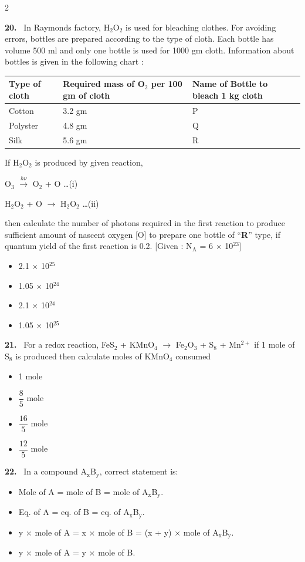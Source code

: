 \documentclass[10pt]{extarticle}
\newcommand{\qn}[1]{\par\smallskip\noindent\textbf{#1.}~}
\newenvironment{qoptions}{\begin{itemize}[leftmargin=1.8em,itemsep=1pt,topsep=2pt,label={}]}{\end{itemize}}
\newcommand{\opt}[2]{\item[(#1)] #2}
\begin{document}
\begin{multicols}{2}
\begin{qoptions}
\end{qoptions}
\qn{20} In Raymonds factory, H$_2$O$_2$ is used for bleaching clothes. For avoiding errors, bottles are prepared according to the type of cloth. Each bottle has volume 500 ml and only one bottle is used for 1000 gm cloth. Information about bottles is given in the following chart :\par
{\small\setlength{\tabcolsep}{4pt}\noindent\begin{tabular}{|p{1.5cm}|p{2.7cm}|p{2.7cm}|}\hline Type of cloth & Required mass of O$_2$ per 100 gm of cloth & Name of Bottle to bleach 1 kg cloth\\\hline Cotton & 3.2 gm & P\\\hline Polyster & 4.8 gm & Q\\\hline Silk & 5.6 gm & R\\\hline\end{tabular}}\par
If H$_2$O$_2$ is produced by given reaction,\par
O$_3$ $\xrightarrow{h\nu}$ O$_2$ + O \hfill \dots(i)\par
H$_2$O$_2$ + O $\longrightarrow$ H$_2$O$_2$ \hfill \dots(ii)\par
then calculate the number of photons required in the first reaction to produce sufficient amount of nascent oxygen [O] to prepare one bottle of ``\textbf{R}'' type, if quantum yield of the first reaction is 0.2. [Given : N$_\mathrm A$ = 6 $\times$ 10$^{23}$]
\begin{qoptions}
\opt{A}{2.1 $\times$ 10$^{25}$}
\opt{B}{1.05 $\times$ 10$^{24}$}
\opt{C}{2.1 $\times$ 10$^{24}$}
\opt{D}{1.05 $\times$ 10$^{25}$}
\end{qoptions}
\qn{21} For a redox reaction, FeS$_2$ + KMnO$_4$ $\longrightarrow$ Fe$_2$O$_3$ + S$_8$ + Mn$^{2+}$ if 1 mole of S$_8$ is produced then calculate moles of KMnO$_4$ consumed
\begin{qoptions}
\opt{A}{1 mole}
\opt{B}{$\dfrac85$ mole}
\opt{C}{$\dfrac{16}5$ mole}
\opt{D}{$\dfrac{12}5$ mole}
\end{qoptions}
\qn{22} In a compound A$_\mathrm x$B$_\mathrm y$, correct statement is:
\begin{qoptions}
\opt{A}{Mole of A = mole of B = mole of A$_\mathrm x$B$_\mathrm y$.}
\opt{B}{Eq. of A = eq. of B = eq. of A$_\mathrm x$B$_\mathrm y$.}
\opt{C}{y $\times$ mole of A = x $\times$ mole of B = (x + y) $\times$ mole of A$_\mathrm x$B$_\mathrm y$.}
\opt{D}{y $\times$ mole of A = y $\times$ mole of B.}
\end{qoptions}

\end{multicols}
\end{document}

